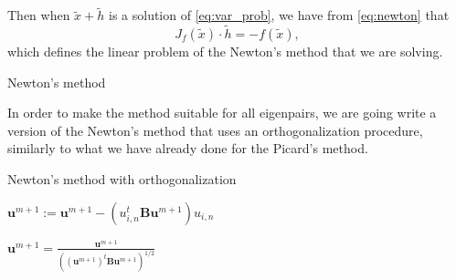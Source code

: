 \documentclass[preprint,12pt]{elsarticle}
\begin{document}
Then when $\tilde x + \tilde h$ is a solution of \eqref{eq:var_prob}, we have from \eqref{eq:newton}
that 
$$
J_f(\tilde x)\cdot \tilde h = - f(\tilde x),
$$
which defines the linear problem of the Newton's method that we are solving.
\begin{algorithm}[H] \caption{Newton's method} \label{alg:newton} 
\begin{algorithmic}


\REPEAT

\end{algorithmic}
\end{algorithm}

In order to make the method suitable for all eigenpairs, we are going write a version of the Newton's method that uses an orthogonalization procedure, similarly to what we have already done for the Picard's method.
\begin{algorithm}[H] \caption{Newton's method with orthogonalization} \label{alg:newton_ortho} 
\begin{algorithmic}

    

\REPEAT



\STATE $\mathbf{u}^{m+1}:=\mathbf{u}^{m+1}-(u_{i,n}^t\mathbf{B}\mathbf{u}^{m+1})u_{i,n}$
\ENDFOR


\STATE $\displaystyle \mathbf{u}^{m+1}=\frac{\mathbf{u}^{m+1}}{((\mathbf{u}^{m+1})^t\mathbf{B}\mathbf{u}^{m+1})^{1/2}}$
\end{algorithmic}
\end{algorithm}
\end{document}
